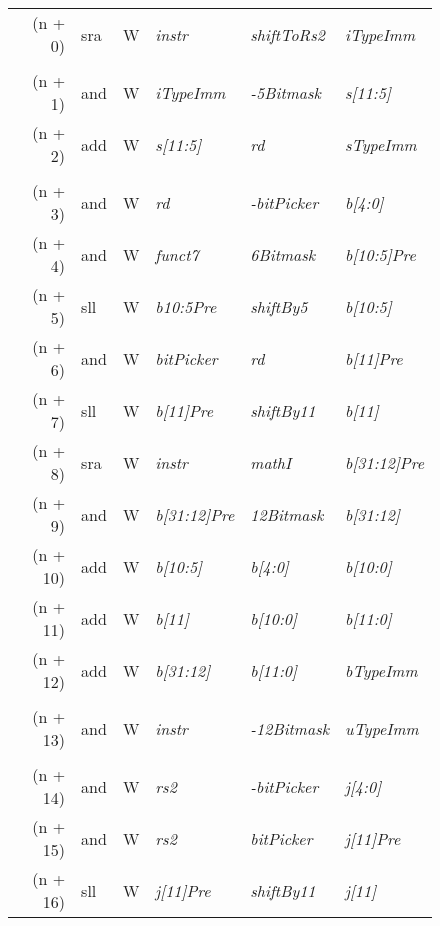 \begin{figure}
    \centering
    \begin{tabular}[h]{>{\ttfamily\color{UniRed}}r >{\ttfamily}l >{\ttfamily\color{UniGrey}}l >{\slshape\color{UniRed}}l >{\slshape\color{UniRed}}l >{\slshape} l}
        \hline
        \hline
        (n + 0)  & sra & W & instr       & shiftToRs2                    & iTypeImm    \\
        \\
        (n + 1)  & and & W & iTypeImm    & \textcolor{Black}{-}5Bitmask  & s[11:5]     \\
        (n + 2)  & add & W & s[11:5]     & rd                            & sTypeImm    \\
        \\
        (n + 3)  & and & W & rd          & \textcolor{Black}{-}bitPicker & b[4:0]      \\
        (n + 4)  & and & W & funct7      & 6Bitmask                      & b[10:5]Pre  \\
        (n + 5)  & sll & W & b{10:5}Pre  & shiftBy5                      & b[10:5]     \\
        (n + 6)  & and & W & bitPicker   & rd                            & b[11]Pre    \\
        (n + 7)  & sll & W & b[11]Pre    & shiftBy11                     & b[11]       \\
        (n + 8)  & sra & W & instr       & mathI                         & b[31:12]Pre \\
        (n + 9)  & and & W & b[31:12]Pre & 12Bitmask                     & b[31:12]    \\
        (n + 10) & add & W & b[10:5]     & b[4:0]                        & b[10:0]     \\
        (n + 11) & add & W & b[11]       & b[10:0]                       & b[11:0]     \\
        (n + 12) & add & W & b[31:12]    & b[11:0]                       & bTypeImm    \\
        \\
        (n + 13) & and & W & instr       & \textcolor{Black}{-}12Bitmask & uTypeImm    \\
        \\
        (n + 14) & and & W & rs2         & \textcolor{Black}{-}bitPicker & j[4:0]      \\
        (n + 15) & and & W & rs2         & bitPicker                     & j[11]Pre    \\
        (n + 16) & sll & W & j[11]Pre    & shiftBy11                     & j[11]       \\

\end{tabular}
\end{figure}
